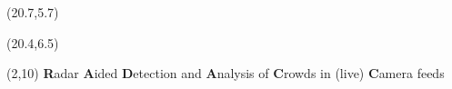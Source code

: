\documentclass[%
textcolor=HDA_lightblue,	%
pagecolor=radacc_darkblue,		%
]{../estposter}
\begin{document}
\begin{textblock}{5.4}(20.7,5.7)
\begin{center}
\end{center}
\end{textblock}
\begin{textblock}{5.4}(20.4,6.5)
\begin{center}
\end{center}
\end{textblock}



\titleblock{\textcolor{HDA_gray_0}{Bachelor PSE}} %
\begin{textblock}{26}(2,10) 
\color{HDA_gray_0}
\textbf{R}adar \textbf{A}ided \textbf{D}etection and \textbf{A}nalysis of \textbf{C}rowds in \small{(live)} \textbf{C}amera feeds	%
\end{textblock}



\end{document}
